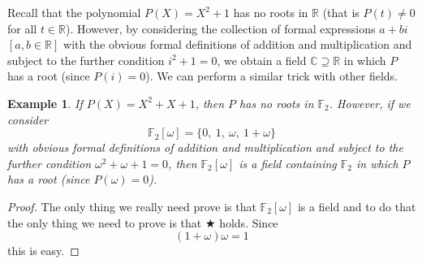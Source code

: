 \documentclass[12pt,a4paper]{article}
\theoremstyle{plain}
\newtheorem{example}[theorem]{Example}
\theoremstyle{definition}
\begin{document}
    Recall that the polynomial $P(X)=X^{2}+1$ has no roots
    in ${\mathbb R}$ (that is $P(t)\neq 0$ for all $t\in{\mathbb R}$).
    However, by considering the collection
    of formal expressions $a+bi$ $[a,b\in{\mathbb R}]$
    with the
    obvious formal definitions of addition and multiplication
    and subject to the further
    condition $i^{2}+1=0$, we obtain a field
    ${\mathbb C}\supseteq{\mathbb R}$ in which $P$ has a root
    (since $P(i)=0$).
    We can perform a similar trick with other fields.
    \begin{example}
        If $P(X)=X^{2}+X+1$, then $P$ has
        no roots in ${\mathbb F}_{2}$. However, if we consider
        \[{\mathbb F}_{2}[\omega]=
        \{0,\ 1,\ \omega,\ 1+\omega\}\]
        with
        obvious formal definitions of addition and multiplication
        and subject to the further
        condition $\omega^{2}+\omega+1=0$, then
        ${\mathbb F}_{2}[\omega]$ is a field containing ${\mathbb F}_{2}$
        in which $P$ has a root (since $P(\omega)=0$).
    \end{example}
    \begin{proof}
        The only thing we really
        need prove is that
        ${\mathbb F}_{2}[\omega]$ is a field and to
        do that the only thing we need to prove is that
        $\bigstar$ holds. Since
        \[(1+\omega)\omega=1\]
        this is easy.
    \end{proof}
\end{document}
